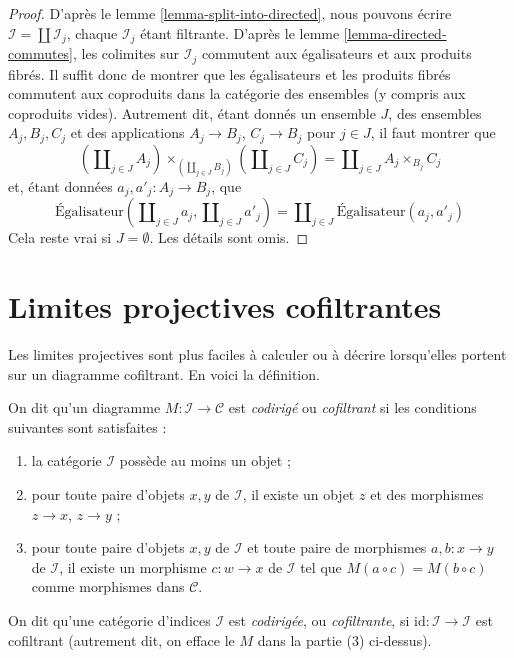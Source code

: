 \begin{proof}
D'après le lemme \ref{lemma-split-into-directed},
nous pouvons écrire $\mathcal{I} = \coprod \mathcal{I}_j$, chaque
$\mathcal{I}_j$ étant filtrante. D'après le
lemme \ref{lemma-directed-commutes}, les colimites sur $\mathcal{I}_j$
commutent aux égalisateurs et aux produits fibrés. Il suffit donc de montrer
que les égalisateurs et les produits fibrés commutent aux coproduits dans la
catégorie des ensembles (y compris aux coproduits vides).
Autrement dit, étant donnés un ensemble $J$, des ensembles
$A_j, B_j, C_j$ et des applications
$A_j \to B_j$, $C_j \to B_j$ pour $j \in J$, il faut montrer que
$$
(\coprod\nolimits_{j \in J} A_j)
\times_{(\coprod\nolimits_{j \in J} B_j)}
(\coprod\nolimits_{j \in J} C_j)
=
\coprod\nolimits_{j \in J} A_j \times_{B_j} C_j
$$
et, étant données $a_j, a'_j : A_j \to B_j$, que
$$
\text{Égalisateur}(
\coprod\nolimits_{j \in J} a_j,
\coprod\nolimits_{j \in J} a'_j)
=
\coprod\nolimits_{j \in J}
\text{Égalisateur}(a_j, a'_j)
$$
Cela reste vrai si $J = \emptyset$. Les détails sont omis.
\end{proof}



\section{Limites projectives cofiltrantes}
\label{section-codirected-limits}

\noindent
Les limites projectives sont plus faciles à calculer ou à décrire lorsqu'elles
portent sur un diagramme cofiltrant. En voici la définition.

\begin{definition}
\label{definition-codirected}
On dit qu'un diagramme $M : \mathcal{I} \to \mathcal{C}$ est
{\it codirigé} ou {\it cofiltrant} si les conditions suivantes sont satisfaites :
\begin{enumerate}
\item la catégorie $\mathcal{I}$ possède au moins un objet ;
\item pour toute paire d'objets $x, y$ de $\mathcal{I}$, il existe un objet
$z$ et des morphismes $z \to x$, $z \to y$ ;
\item pour toute paire d'objets $x, y$ de $\mathcal{I}$ et toute paire de
morphismes $a, b : x \to y$ de $\mathcal{I}$, il existe un morphisme
$c : w \to x$ de $\mathcal{I}$ tel que
$M(a \circ c) = M(b \circ c)$ comme morphismes dans $\mathcal{C}$.
\end{enumerate}
On dit qu'une catégorie d'indices $\mathcal{I}$ est {\it codirigée}, ou
{\it cofiltrante}, si $\text{id} : \mathcal{I} \to \mathcal{I}$ est
cofiltrant (autrement dit, on efface le $M$ dans la partie (3) ci-dessus).
\end{definition}


